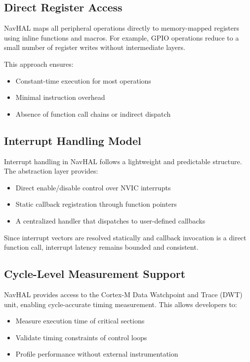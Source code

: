 \subsection*{Direct Register Access}

NavHAL maps all peripheral operations directly to memory-mapped registers using inline functions and macros. For example, GPIO operations reduce to a small number of register writes without intermediate layers.

This approach ensures:
\begin{itemize}
    \item Constant-time execution for most operations
    \item Minimal instruction overhead
    \item Absence of function call chains or indirect dispatch
\end{itemize}

\subsection*{Interrupt Handling Model}

Interrupt handling in NavHAL follows a lightweight and predictable structure. The abstraction layer provides:

\begin{itemize}
    \item Direct enable/disable control over NVIC interrupts
    \item Static callback registration through function pointers
    \item A centralized handler that dispatches to user-defined callbacks
\end{itemize}

Since interrupt vectors are resolved statically and callback invocation is a direct function call, interrupt latency remains bounded and consistent.

\subsection*{Cycle-Level Measurement Support}

NavHAL provides access to the Cortex-M Data Watchpoint and Trace (DWT) unit, enabling cycle-accurate timing measurement. This allows developers to:

\begin{itemize}
    \item Measure execution time of critical sections
    \item Validate timing constraints of control loops
    \item Profile performance without external instrumentation
\end{itemize}

